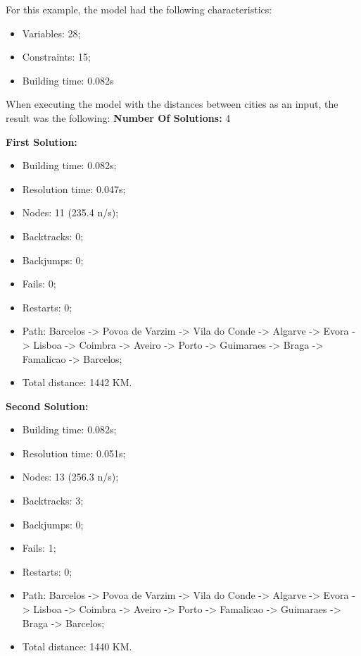 \documentclass[runningheads,a4paper,english]{llncs}[2022/01/12]
\begin{document}
For this example, the model had the following characteristics:
\begin{itemize}
  \item Variables: 28;
  \item Constraints: 15;
  \item Building time: 0.082s
\end{itemize}\newpage
When executing the model with the distances between cities as an input, the result was the following:\newline
\textbf{Number Of Solutions:} 4\newline\par
\textbf{First Solution:}
\begin{itemize}
  \item Building time: 0.082s;
  \item Resolution time: 0.047s;
  \item Nodes: 11 (235.4 n/s);
  \item Backtracks: 0;
  \item Backjumps: 0;
  \item Fails: 0;
  \item Restarts: 0;
  \item Path: Barcelos -> Povoa de Varzim -> Vila do Conde -> Algarve -> Evora -> Lisboa -> Coimbra -> Aveiro -> Porto -> Guimaraes -> Braga -> Famalicao -> Barcelos;
  \item Total distance: 1442 KM.
\end{itemize}


\textbf{Second Solution:}
\begin{itemize}
  \item Building time: 0.082s;
  \item Resolution time: 0.051s;
  \item Nodes: 13 (256.3 n/s);
  \item Backtracks: 3;
  \item Backjumps: 0;
  \item Fails: 1;
  \item Restarts: 0;
  \item  Path: Barcelos -> Povoa de Varzim -> Vila do Conde -> Algarve -> Evora -> Lisboa -> Coimbra -> Aveiro -> Porto -> Famalicao -> Guimaraes -> Braga -> Barcelos;
  \item Total distance: 1440 KM.
\end{itemize}
\end{document}
